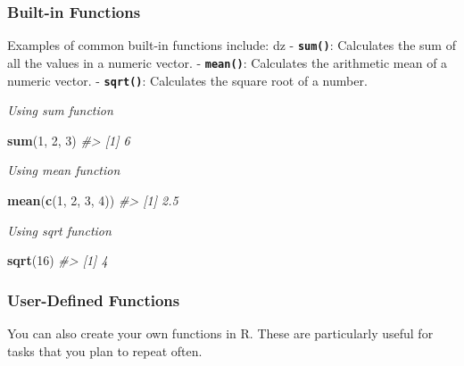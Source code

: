 \documentclass[
]{book}
\newenvironment{Shaded}{\begin{snugshade}}{\end{snugshade}}
\newcommand{\CommentTok}[1]{\textcolor[rgb]{0.56,0.35,0.01}{\textit{#1}}}
\newcommand{\DecValTok}[1]{\textcolor[rgb]{0.00,0.00,0.81}{#1}}
\newcommand{\FunctionTok}[1]{\textcolor[rgb]{0.13,0.29,0.53}{\textbf{#1}}}
\newcommand{\NormalTok}[1]{#1}
\begin{document}
\hypertarget{built-in-functions}{%
\subsubsection*{Built-in Functions}\label{built-in-functions}}

Examples of common built-in functions include: dz - \textbf{\texttt{sum()}}: Calculates the sum of all the values in a numeric vector. - \textbf{\texttt{mean()}}: Calculates the arithmetic mean of a numeric vector. - \textbf{\texttt{sqrt()}}: Calculates the square root of a number.

\emph{Using sum function}

\begin{Shaded}
\begin{Highlighting}[]
\FunctionTok{sum}\NormalTok{(}\DecValTok{1}\NormalTok{, }\DecValTok{2}\NormalTok{, }\DecValTok{3}\NormalTok{)}
\CommentTok{\#\textgreater{} [1] 6}
\end{Highlighting}
\end{Shaded}

\emph{Using mean function}

\begin{Shaded}
\begin{Highlighting}[]
\FunctionTok{mean}\NormalTok{(}\FunctionTok{c}\NormalTok{(}\DecValTok{1}\NormalTok{, }\DecValTok{2}\NormalTok{, }\DecValTok{3}\NormalTok{, }\DecValTok{4}\NormalTok{))}
\CommentTok{\#\textgreater{} [1] 2.5}
\end{Highlighting}
\end{Shaded}

\emph{Using sqrt function}

\begin{Shaded}
\begin{Highlighting}[]
\FunctionTok{sqrt}\NormalTok{(}\DecValTok{16}\NormalTok{)}
\CommentTok{\#\textgreater{} [1] 4}
\end{Highlighting}
\end{Shaded}

\hypertarget{user-defined-functions}{%
\subsubsection*{User-Defined Functions}\label{user-defined-functions}}

You can also create your own functions in R. These are particularly useful for tasks that you plan to repeat often.
\end{document}
